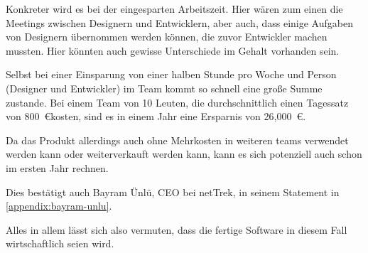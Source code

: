 Konkreter wird es bei der eingesparten Arbeitszeit.
Hier wären zum einen die Meetings zwischen Designern und Entwicklern, aber auch, dass einige Aufgaben von Designern übernommen werden können, die zuvor Entwickler machen mussten.
Hier könnten auch gewisse Unterschiede im Gehalt vorhanden sein.

Selbst bei einer Einsparung von einer halben Stunde pro Woche und Person (Designer und Entwickler) im Team kommt so schnell eine große Summe zustande.
Bei einem Team von 10 Leuten, die durchschnittlich einen Tagessatz von 800~\euro kosten, sind es in einem Jahr eine Ersparnis von 26,000~\euro.

Da das Produkt allerdings auch ohne Mehrkosten in weiteren teams verwendet werden kann oder weiterverkauft werden kann, kann es sich potenziell auch schon im ersten Jahr rechnen.

Dies bestätigt auch Bayram Ünlü, \ac{CEO} bei \ac{netTrek}, in seinem Statement in \autoref{appendix:bayram-unlu}.

Alles in allem lässt sich also vermuten, dass die fertige Software in diesem Fall wirtschaftlich seien wird.
